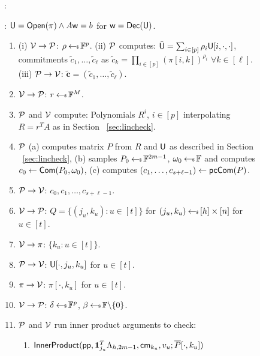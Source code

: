 \begin{figure}[h!]
	{\footnotesize
		\begin{framed}
			: 			%
			
			: $\mathsf{U}=\mathsf{Open}(\pi)\wedge A\mathsf{w}=b$ for $\mathsf{w}=\mathsf{Dec}(\mathsf{U})$.
			
			\begin{enumerate}[{\rm 1.}]
				\item (i) $\mathcal{V}\rightarrow\mathcal{P}$: $\rho\hskip2.3pt{\gets\!\!\mbox{\tiny${\$}$\normalsize}}\, \mathbb{F}^p$. (ii) 
			 $\mathcal{P}$ computes: $\tilde{\mathsf{U}}=\sum_{i\in [p]}\rho_i\mathsf{U}[i,\cdot,\cdot]$, 
				commitments $\tilde{c}_1,\ldots,\tilde{c}_\ell$ as $\tilde{c}_k = \prod_{i\in[p]}(\pi[i,k])^{\rho_i}$ $\forall k\in[\ell]$.
				(iii) $\mathcal{P}\rightarrow\mathcal{V}$: $\tilde{\bm{c}}=(\tilde{c}_1,\ldots,\tilde{c}_\ell)$.
				\item $\mathcal{V}\rightarrow\mathcal{P}$: $r\hskip2.3pt{\gets\!\!\mbox{\tiny${\$}$\normalsize}}\, \mathbb{F}^M$.
				\item $\mathcal{P}$ and $\mathcal{V}$ compute: Polynomials $R^i$, $i\in [p]$ interpolating $R=r^TA$
				as in Section ~\ref{sec:lincheck}. 
				\item $\mathcal{P}$ (a) computes matrix $P$ from $R$ and $\mathsf{U}$ as described in Section ~\ref{sec:lincheck}, (b) samples $P_0\hskip2.3pt{\gets\!\!\mbox{\tiny${\$}$\normalsize}}\, \mathbb{F}^{2m-1}$, $\omega_0\hskip2.3pt{\gets\!\!\mbox{\tiny${\$}$\normalsize}}\, \mathbb{F}$ and computes $c_0\gets \mathsf{Com}(P_0,\omega_0)$, (c)
				computes $(c_1,\ldots,c_{s+\ell-1}) \gets \mathsf{pcCom}(P)$.
				\item $\mathcal{P}\rightarrow\mathcal{V}$: $c_0,c_1,\ldots,c_{s+\ell-1}$.
				\item $\mathcal{V}\rightarrow\mathcal{P}$: $Q=\{(j_u,k_u):u\in [t]\}$ for $(j_u,k_u)\hskip2.3pt{\gets\!\!\mbox{\tiny${\$}$\normalsize}}\, [h]\times [n]$ for $u\in [t]$.
				\item $\mathcal{V}\rightarrow\pi$: $\{k_u:u\in [t]\}$.
				\item $\mathcal{P}\rightarrow\mathcal{V}$: $\mathsf{U}[\cdot,j_u,k_u]$ for $u\in [t]$.
				\item $\pi\rightarrow\mathcal{V}$: $\pi[\cdot,k_u]$ for $u\in [t]$.
				\item $\mathcal{V}\rightarrow\mathcal{P}$: $\delta\hskip2.3pt{\gets\!\!\mbox{\tiny${\$}$\normalsize}}\, \mathbb{F}^p$, $\beta\hskip2.3pt{\gets\!\!\mbox{\tiny${\$}$\normalsize}}\, \mathbb{F}\backslash \{0\}$. 
				\item $\mathcal{P}$ and $\mathcal{V}$ run inner product arguments to check:
				\begin{enumerate}
					\item $\mathsf{InnerProduct}(\mathsf{pp},\bm{1}_{j_u}^T\Lambda_{h,2m-1},\mathsf{cm}_{k_u},v_u;\overline{P}[\cdot,k_u])$ 

\end{enumerate}
\end{enumerate}
\end{framed}}
\end{figure}
